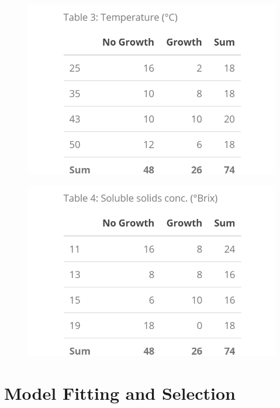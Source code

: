 \documentclass[
  12pt,
]{article}
\begin{document}
\begin{figure}
\centering
\begin{minipage}{.5\textwidth}
  \centering
  \caption*{}
  \includegraphics[width=\linewidth]{temperature}
  \label{table3:temperature}
\end{minipage}%
\begin{minipage}{.5\textwidth}
  \centering
  \caption*{}
  \includegraphics[width=\linewidth]{brix}
  \label{table4:brix}
\end{minipage}
\end{figure}

\hypertarget{model-fitting-and-selection}{%
\section{Model Fitting and
Selection}\label{model-fitting-and-selection}}
\end{document}
